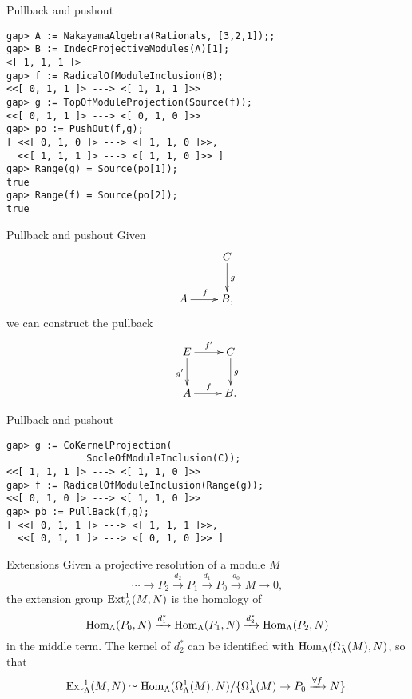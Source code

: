 \begin{frame}[fragile]{Pullback and pushout}
\begin{verbatim}
gap> A := NakayamaAlgebra(Rationals, [3,2,1]);;                       
gap> B := IndecProjectiveModules(A)[1];
<[ 1, 1, 1 ]>
gap> f := RadicalOfModuleInclusion(B);
<<[ 0, 1, 1 ]> ---> <[ 1, 1, 1 ]>>
gap> g := TopOfModuleProjection(Source(f));
<<[ 0, 1, 1 ]> ---> <[ 0, 1, 0 ]>>
gap> po := PushOut(f,g);
[ <<[ 0, 1, 0 ]> ---> <[ 1, 1, 0 ]>>,
  <<[ 1, 1, 1 ]> ---> <[ 1, 1, 0 ]>> ]
gap> Range(g) = Source(po[1]);
true
gap> Range(f) = Source(po[2]);
true
\end{verbatim}
\end{frame}

\begin{frame}[fragile]{Pullback and pushout}
Given
\[\vcenter{\xymatrix{ & C\ar[d]^g\\  A\ar[r]^f & B,}}\]
we can construct the pullback 
\[\xymatrix{E\ar[r]^{f'}\ar[d]_{g'} & C\ar[d]^g\\ A\ar[r]^f & B.}\]
\end{frame}

\begin{frame}[fragile]{Pullback and pushout}

\begin{verbatim}
gap> g := CoKernelProjection(
              SocleOfModuleInclusion(C));
<<[ 1, 1, 1 ]> ---> <[ 1, 1, 0 ]>>
gap> f := RadicalOfModuleInclusion(Range(g));
<<[ 0, 1, 0 ]> ---> <[ 1, 1, 0 ]>>
gap> pb := PullBack(f,g);
[ <<[ 0, 1, 1 ]> ---> <[ 1, 1, 1 ]>>,
  <<[ 0, 1, 1 ]> ---> <[ 0, 1, 0 ]>> ]
\end{verbatim}
\end{frame}

\begin{frame}{Extensions}
Given a projective resolution of a module $M$ 
\[\cdots\to P_2\xrightarrow{d_2} P_1\xrightarrow{d_1}
P_0\xrightarrow{d_0} M\to 0,\]
the extension group $\operatorname{Ext}\nolimits^1_\Lambda(M,N)$ is the homology 
of 
\[\operatorname{Hom}_\Lambda(P_0,N)\xrightarrow{d_1^*} \operatorname{Hom}_\Lambda(P_1,N)
\xrightarrow{d_2^*} \operatorname{Hom}_\Lambda(P_2,N)
\]
in the middle term.  The kernel of $d_2^*$ can be identified with
$\operatorname{Hom}_\Lambda(\Omega^1_\Lambda(M),N)$, so that 
\[\operatorname{Ext}\nolimits^1_\Lambda(M,N)\simeq \operatorname{Hom}_\Lambda(\Omega^1_\Lambda(M),N)/\{
\Omega^1_\Lambda(M)\to P_0\xrightarrow{\forall f} N\}.\]  
\end{frame}

